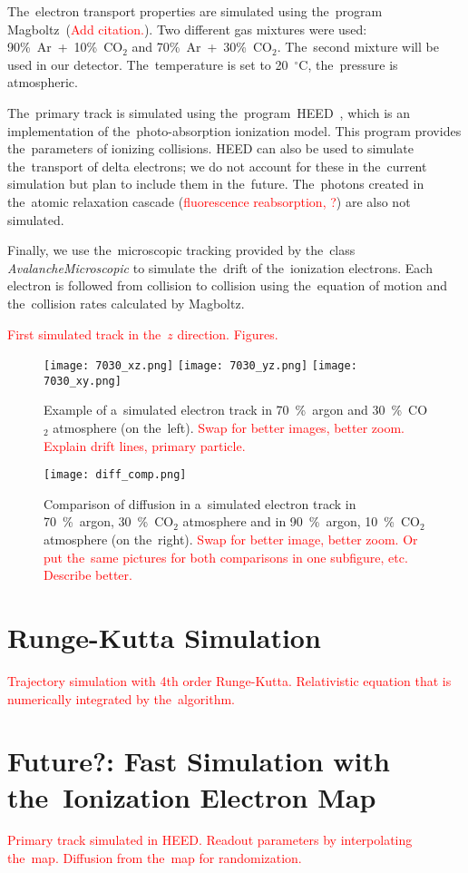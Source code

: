 		The~electron transport properties are simulated using the~program Magboltz~(\textcolor{red}{Add citation.}). Two different gas mixtures were used: 90\%~Ar~+~10\%~CO$_2$ and 70\%~Ar~+~30\%~CO$_2$. The~second mixture will be used in our detector. The~temperature is set to 20~$^\circ$C, the~pressure is atmospheric.
		
		The~primary track is simulated using the~program~\ac{HEED}~\cite{HEED}, which is an implementation of the~photo-absorption ionization model. This program provides the~parameters of ionizing collisions. \ac{HEED} can also be used to simulate the~transport of delta electrons; we do not account for these in the~current simulation but plan to include them in the~future. The~photons created in the~atomic relaxation cascade (\textcolor{red}{fluorescence reabsorption, ?}) are also not simulated.
		
		Finally, we use the~microscopic tracking provided by the~class \textit{AvalancheMicroscopic} to simulate the~drift of the~ionization electrons. Each electron is followed from collision to collision using the~equation of motion and the~collision rates calculated by Magboltz.
		
		\textcolor{red}{First simulated track in the~$z$ direction. Figures.}
		
		\begin{figure}
			\centering
			\texttt{[image: 7030\_xz.png]}
			\texttt{[image: 7030\_yz.png]}
			\texttt{[image: 7030\_xy.png]}
			\caption{Example of a~simulated electron track in 70~\%~argon and 30~\%~CO$_2$ atmosphere (on the~left). \textcolor{red}{Swap for better images, better zoom. Explain drift lines, primary particle.}}
			\label{fig:7030sim}
		\end{figure}
		
		\begin{figure}
			\centering
			\texttt{[image: diff\_comp.png]}
			\caption{Comparison of diffusion in a~simulated electron track in 70~\%~argon, 30~\%~CO$_2$ atmosphere and in 90~\%~argon, 10~\%~CO$_2$ atmosphere (on the~right). \textcolor{red}{Swap for better image, better zoom. Or put the~same pictures for both comparisons in one subfigure, etc. Describe better.}}
			\label{fig:diffcomp}
		\end{figure}
	
	\section{Runge-Kutta Simulation}
	\label{sec:rks}
		\textcolor{red}{Trajectory simulation with 4th order Runge-Kutta. Relativistic equation that is numerically integrated by the~algorithm.}
	
	\section{Future?: Fast Simulation with the~Ionization Electron Map}
		\textcolor{red}{Primary track simulated in HEED. Readout parameters by interpolating the~map. Diffusion from the~map for randomization.}